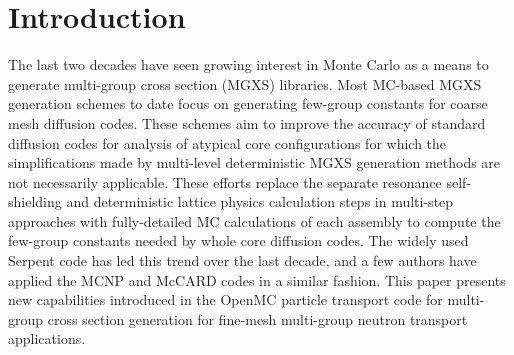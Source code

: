 \section{Introduction}
\label{sec:intro}

The last two decades have seen growing interest in Monte Carlo as a means to generate multi-group cross section (MGXS) libraries. Most MC-based MGXS generation schemes to date focus on generating few-group constants for coarse mesh diffusion codes. These schemes aim to improve the accuracy of standard diffusion codes for analysis of atypical core configurations for which the simplifications made by multi-level deterministic MGXS generation methods are not necessarily applicable. These efforts replace the separate resonance self-shielding and deterministic lattice physics calculation steps in multi-step approaches with fully-detailed MC calculations of each assembly to compute the few-group constants needed by whole core diffusion codes. The widely used Serpent code\cite{leppanen2007serpent} has led this trend over the last decade, and a few authors have applied the MCNP\cite{pounders2006stochastically} and McCARD\cite{shim2008generation} codes in a similar fashion. This paper presents new capabilities introduced in the OpenMC\cite{romano2015openmc} particle transport code for multi-group cross section generation for fine-mesh multi-group neutron transport applications.
